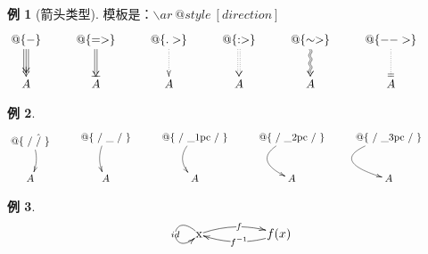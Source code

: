 \documentclass[openany]{ctexart}
\theoremstyle{definition}
\newtheorem{exam}{例}
\begin{document}
\begin{exam}[箭头类型]
模板是：$\backslash ar ~ @style ~ [direction]$ 
\begin{align*}
\xymatrix{
    @\{ - \} \ar @3{->>} [d] &
    @\{ => \} \ar @{=>|} [d] & 
    @\{ .> \} \ar @{.>} [d] &
    @\{ :> \} \ar @{:>} [d] &
    @\{ \sim > \}  \ar @2{~>} [d] &
    @\{ --> \} \ar @{.||} [d] & \\
    A & A & A & A & A & A \\
} 
\end{align*}
\end{exam}

\begin{exam}
\begin{align*}
\xymatrix{
\txt{@\{ / \^ / \}} \ar@/^/[d] & 
\text{@\{ / \_ / \}} \ar@/_/[d] &
\text{@\{ / \_1pc / \}} \ar@/_1pc/[d] &
\text{@\{ / \_2pc / \}} \ar@/_2pc/[d] &
\text{@\{ / \_3pc / \}} \ar@/_3pc/[d] &
\\
A & A & A & A & A \\
} 
\end{align*}
\end{exam}

\begin{exam} 
\begin{align*}
\xymatrix@1{
\text{x} \ar@(ul,dl)|{id} \ar@/^/[rr]|f & & f(x) \ar@/^/[ll]|{f^{-1}}
}
\end{align*}
\end{exam}

    
\end{document}
